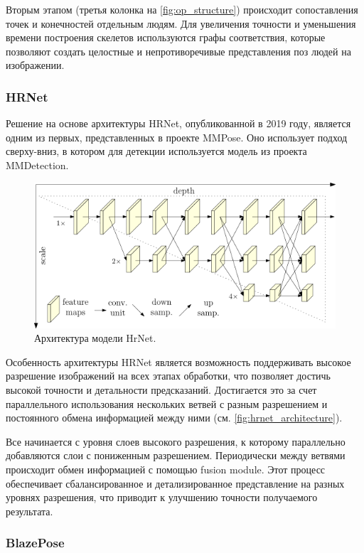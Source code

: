 Вторым этапом (третья колонка на \autoref{fig:op_structure}) происходит сопоставления точек и конечностей отдельным людям. Для увеличения точности и уменьшения времени построения скелетов используются графы соответствия, которые позволяют создать целостные и непротиворечивые представления поз людей на изображении.

\subsubsection*{HRNet}

Решение на основе архитектуры HRNet, опубликованной в 2019 году, является одним из первых, представленных в проекте MMPose. Оно использует подход сверху-вниз, в котором для детекции используется модель из проекта MMDetection.

\begin{figure}[h]
	\centering
	\includegraphics[width=.9\textwidth]{./images/review/hrnet_architecture}
	\caption{Архитектура модели HrNet. \cite{hrnet}}
	\label{fig:hrnet_architecture}
\end{figure}

Особенность архитектуры HRNet является возможность поддерживать высокое разрешение изображений на всех этапах обработки, что позволяет достичь высокой точности и детальности предсказаний. Достигается это за счет параллельного использования нескольких ветвей с разным разрешением и постоянного обмена информацией между ними (см. \autoref{fig:hrnet_architecture}).

Все начинается с уровня слоев высокого разрешения, к которому параллельно добавляются слои с пониженным разрешением. Периодически между ветвями происходит обмен  информацией с помощью fusion module. Этот процесс обеспечивает сбалансированное и детализированное представление на разных уровнях разрешения, что приводит к улучшению точности получаемого результата.

\subsubsection*{BlazePose}

